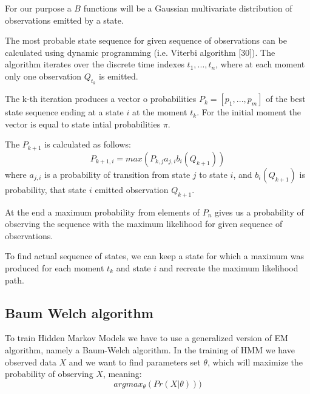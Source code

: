 \documentclass[12pt,a4paper,english]{article}
\begin{document}
For our purpose a $B$ functions will be a Gaussian multivariate distribution of observations emitted by a state. \newline

The most probable state sequence for given sequence of observations can be calculated using dynamic programming (i.e. Viterbi algorithm [30]). \newline
The algorithm iterates over the discrete time indexes $t_1, ..., t_n$, where at each moment only one observation $Q_{t_k}$ is emitted. \newline

The k-th iteration produces a vector o probabilities $P_k=[p_1, ..., p_m]$ of the best state sequence ending at a state $i$ at the moment $t_k$.
For the initial moment the vector is equal to state intial probabilities $\pi$. \newline

The $P_{k+1}$ is calculated as follows:
\begin{equation}
    P_{k+1, i} = max(P_{k, j} a_{j, i} b_i(Q_{k+1}))
\end{equation}
where $a_{j, i}$ is a probability of transition from state $j$ to state $i$, \newline
and $b_i(Q_{k+1})$ is probability, that state $i$ emitted observation $Q_{k+1}$. \newline

At the end a maximum probability from elements of $P_n$ gives us a probability of observing the sequence with the maximum likelihood for given sequence of observations. \newline

To find actual sequence of states, we can keep a state for which a maximum was produced for each moment $t_k$ and state $i$ and recreate the maximum likelihood path.

\newpage
\subsection{Baum Welch algorithm}

To train Hidden Markov Models we have to use a generalized version of EM algorithm, namely a Baum-Welch algorithm. \newline
In the training of HMM we have observed data $X$ and we want to find parameters set $\theta$, which will maximize the probability of observing $X$, meaning:
\begin{equation}
    argmax_\theta(Pr(X | \theta)))
\end{equation}
\end{document}
